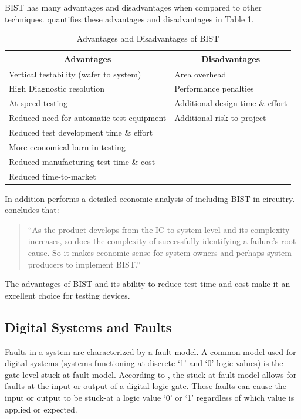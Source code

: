\documentclass[12pt]{report}
\begin{document}
BIST has many advantages and disadvantages when compared to other techniques.  \cite{stroud} quantifies these advantages and disadvantages in Table \ref{tbl:advantages}. 
\begin{table}
	\caption{Advantages and Disadvantages of BIST\cite{stroud}}
	\begin{center}
	\begin{tabular}{|l|l|}
		\hline
		\multicolumn{1}{|c|}{{\bf Advantages}} & \multicolumn{1}{|c|}{{\bf Disadvantages}} \\ \hline
		Vertical testability (wafer to system) & Area overhead \\ \hline
		High Diagnostic resolution & Performance penalties \\ \hline
		At-speed testing & Additional design time \& effort \\ \hline
		Reduced need for automatic test equipment & Additional risk to project \\ \hline
		Reduced test development time \& effort & \\ \hline
		More economical burn-in testing & \\ \hline
		Reduced manufacturing test time \& cost & \\ \hline
		Reduced time-to-market & \\ \hline
	\end{tabular}
	\end{center}
	\label{tbl:advantages}
\end{table}
In addition \cite{ungar} performs a detailed economic analysis of including BIST in circuitry. \cite{ungar} concludes that:
\begin{quote}
``As the product develops from the IC to system level and its complexity increases, so does the complexity of successfully identifying a failure's root cause.  So it makes economic sense for system owners and perhaps system producers to implement BIST.\cite{ungar}''
\end{quote}
The advantages of BIST and its ability to reduce test time and cost make it an excellent choice for testing devices\cite{zorian}.

\subsection{Digital Systems and Faults}
\label{sct:digitalsystems}
Faults in a system are characterized by a fault model.  A common model used for digital systems (systems functioning at discrete `1' and `0' logic values) is the gate-level stuck-at fault model\cite{stroud}.  According to \cite{stroud}, the stuck-at fault model allows for faults at the input or output of a digital logic gate.  These faults can cause the input or output to be stuck-at a logic value `0' or `1' regardless of which value is applied or expected.  
\end{document}
